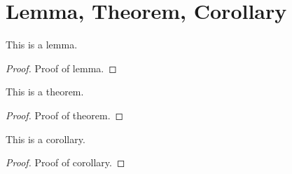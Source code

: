 \section{Lemma, Theorem, Corollary}
\begin{lemma}
    This is a lemma.
\end{lemma}
\begin{proof}
    Proof of lemma.
\end{proof}

\begin{theorem}
    This is a theorem.
\end{theorem}
\begin{proof}
    Proof of theorem.
\end{proof}

\begin{corollary}
    This is a corollary.
\end{corollary}
\begin{proof}
    Proof of corollary.
\end{proof}